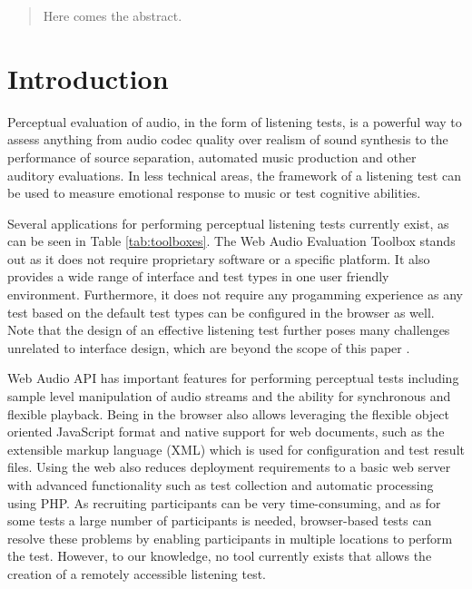 \documentclass{sig-alternate}
\begin{document}
\maketitle
\begin{abstract}
Here comes the abstract. 
\end{abstract}


\section{Introduction}

	Perceptual evaluation of audio, in the form of listening tests, is a powerful way to assess anything from audio codec quality over realism of sound synthesis to the performance of source separation, automated music production and other auditory evaluations.
	In less technical areas, the framework of a listening test can be used to measure emotional response to music or test cognitive abilities. 


	Several applications for performing perceptual listening tests currently exist, as can be seen in Table \ref{tab:toolboxes}. The Web Audio Evaluation Toolbox stands out as it does not require proprietary software or a specific platform. It also provides a wide range of interface and test types in one user friendly environment. Furthermore, it does not require any progamming experience as any test based on the default test types can be configured in the browser as well. Note that the design of an effective listening test further poses many challenges unrelated to interface design, which are beyond the scope of this paper \cite{bech}. 

	Web Audio API has important features for performing perceptual tests including sample level manipulation of audio streams \cite{schoeffler2015mushra} and the ability for synchronous and flexible playback. Being in the browser also allows leveraging the flexible object oriented JavaScript format and native support for web documents, such as the extensible markup language (XML) which is used for configuration and test result files. Using the web also reduces deployment requirements to a basic web server with advanced functionality such as test collection and automatic processing using PHP. As recruiting participants can be very time-consuming, and as for some tests a large number of participants is needed, browser-based tests \cite{schoeffler2015mushra} can resolve these problems by enabling participants in multiple locations to perform the test. However, to our knowledge, no tool currently exists that allows the creation of a remotely accessible listening test. 
\end{document}
